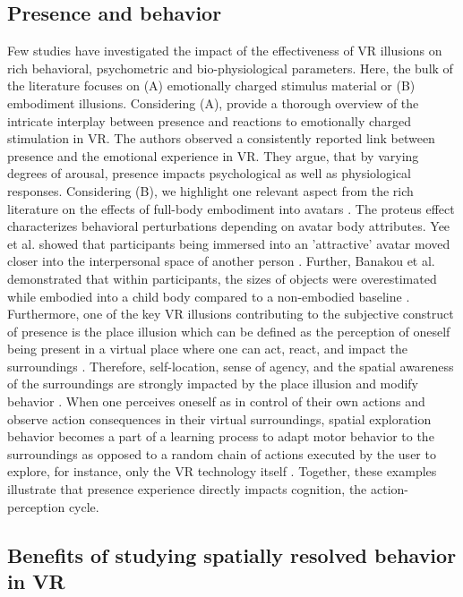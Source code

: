 \subsection{Presence and behavior} %
Few studies have investigated the impact of the effectiveness of VR illusions on rich behavioral, psychometric and bio-physiological parameters. Here, the bulk of the literature focuses on (A) emotionally charged stimulus material or (B) embodiment illusions. Considering (A), \cite{Diemer2015} provide a thorough overview of the intricate interplay between presence and reactions to emotionally charged stimulation in VR. The authors observed a consistently reported link between presence and the emotional experience in VR. They argue, that by varying degrees of arousal, presence impacts psychological as well as physiological responses. Considering (B), we highlight one relevant aspect from the rich literature on the effects of full-body embodiment into avatars \cite{Maister2015}. The proteus effect characterizes behavioral perturbations depending on avatar body attributes. Yee et al. showed that participants being immersed into an 'attractive' avatar moved closer into the interpersonal space of another person \cite{Yee2007}. Further, Banakou et al. demonstrated that within participants, the sizes of objects were overestimated while embodied into a child body compared to a non-embodied baseline \cite{Banakou2013}. Furthermore, one of the key VR illusions contributing to the subjective construct of presence is the place illusion which can be defined as the perception of oneself being present in a virtual place where one can act, react, and impact the surroundings \cite{Slater2009}. Therefore, self-location, sense of agency, and the spatial awareness of the surroundings are strongly impacted by the place illusion and modify behavior \cite{Kilteni2012}. When one perceives oneself as in control of their own actions and observe action consequences in their virtual surroundings, spatial exploration behavior becomes a part of a learning process to adapt motor behavior to the surroundings as opposed to a random chain of actions executed by the user to explore, for instance, only the VR technology itself \cite{Tan2011}. Together, these examples illustrate that presence experience directly impacts cognition, the action-perception cycle.

\subsection{Benefits of studying spatially resolved behavior in VR}



